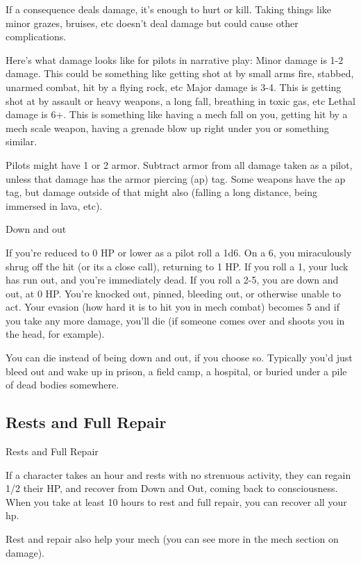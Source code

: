 If a consequence deals damage, it’s enough to hurt or kill. Taking things like minor grazes,
bruises, etc doesn’t deal damage but could cause other complications.

Here’s what damage looks like for pilots in narrative play:
Minor damage is 1-2 damage. This could be something like getting shot at by small arms fire,
stabbed, unarmed combat, hit by a flying rock, etc
Major damage is 3-4. This is getting shot at by assault or heavy weapons, a long fall, breathing
in toxic gas, etc
Lethal damage is 6+. This is something like having a mech fall on you, getting hit by a mech
scale weapon, having a grenade blow up right under you or something similar.

Pilots might have 1 or 2 armor. Subtract armor from all damage taken as a pilot, unless that
damage has the armor piercing (ap) tag. Some weapons have the ap tag, but damage outside of
that might also (falling a long distance, being immersed in lava, etc).

                                                 Down and out




If you’re reduced to 0 HP or lower as a pilot roll a 1d6. On a 6, you miraculously shrug off the hit
(or its a close call), returning to 1 HP. If you roll a 1, your luck has run out, and you’re immediately
dead. If you roll a 2-5, you are down and out, at 0 HP. You’re knocked out, pinned, bleeding out,
or otherwise unable to act. Your evasion (how hard it is to hit you in mech combat) becomes 5
and if you take any more damage, you’ll die (if someone comes over and shoots you in the head,
for example).


You can die instead of being down and out, if you choose so. Typically you’d just bleed out and
wake up in prison, a field camp, a hospital, or buried under a pile of dead bodies somewhere.

\subsection{Rests and Full Repair}

                                         Rests and Full Repair

If a character takes an hour and rests with no strenuous activity, they can regain 1/2 their HP, and
recover from Down and Out, coming back to consciousness. When you take at least 10 hours to
rest and full repair, you can recover all your hp.


Rest and repair also help your mech (you can see more in the mech section on damage).


